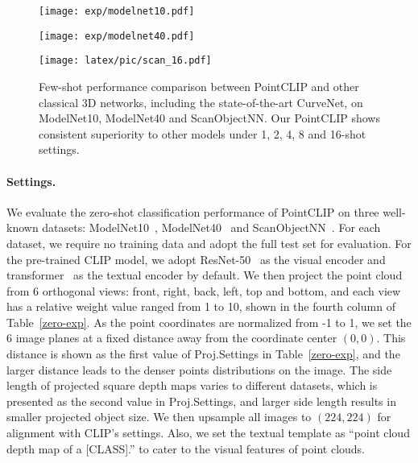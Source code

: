 \documentclass[10pt,twocolumn,letterpaper]{article}
\begin{document}
\begin{figure*}[ht]
    \centering
    
    \begin{minipage}[t]{0.33\linewidth}
    \centering
    \texttt{[image: exp/modelnet10.pdf]}
\end{minipage}
\begin{minipage}[t]{0.33\linewidth}
    \centering
    \texttt{[image: exp/modelnet40.pdf]}
\end{minipage}
    \begin{minipage}[t]{0.33\linewidth}
    \centering
    \texttt{[image: latex/pic/scan\_16.pdf]}
\end{minipage}

    \centering
    \caption{Few-shot performance comparison between PointCLIP and other classical 3D networks, including the state-of-the-art CurveNet, on ModelNet10, ModelNet40 and ScanObjectNN. Our PointCLIP shows consistent superiority to other models under 1, 2, 4, 8 and 16-shot settings.}
    \label{10 datasets}
    \vspace*{-12pt}
\end{figure*}

\paragraph{Settings.}
We evaluate the zero-shot classification performance of PointCLIP on three well-known datasets: ModelNet10~\cite{wu20153d}, ModelNet40~\cite{wu20153d} and ScanObjectNN~\cite{uy2019revisiting}. For each dataset, we require no training data and adopt the full test set for evaluation.
For the pre-trained CLIP model, we adopt ResNet-50~\cite{he2016deep} as the visual encoder and transformer~\cite{vaswani2017attention} as the textual encoder by default. We then project the point cloud from 6 orthogonal views: front, right, back, left, top and bottom, and each view has a relative weight value ranged from 1 to 10, shown in the fourth column of Table~\ref{zero-exp}. As the point coordinates are normalized from -1 to 1, we set the 6 image planes at a fixed distance away from the coordinate center $(0, 0)$. This distance is shown as the first value of Proj.Settings in Table~\ref{zero-exp}, and the larger distance leads to the denser points distributions on the image. The side length of projected square depth maps varies to different datasets, which is presented as the second value in Proj.Settings, and larger side length results in smaller projected object size. We then upsample all images to $(224, 224)$ for alignment with CLIP's settings. Also, we set the textual template as ``point cloud depth map of a [CLASS].'' to cater to the visual features of point clouds.
\end{document}
